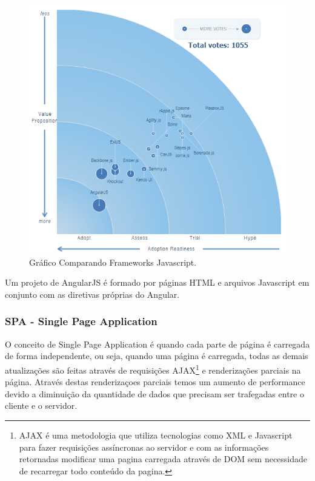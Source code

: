     \begin{figure}[hb]
    \centering
    \includegraphics[scale=0.6]{images/angularjs_framework_comparison.png}
    \caption{Gráfico Comparando Frameworks Javascript.}
    \label{fig:Gráfico Comparando Frameworks Javascript}
    \end{figure}
    
Um projeto de AngularJS é formado por páginas HTML e arquivos Javascript em conjunto com as diretivas próprias do Angular. 

\subsubsection{SPA - Single Page Application}

O conceito de Single Page Application é  quando cada parte de página é carregada de forma independente, ou seja, quando uma página é carregada, todas as demais atualizações são feitas através de requisições AJAX\footnote{AJAX é uma metodologia que utiliza tecnologias como XML e Javascript para fazer requisições assíncronas ao servidor e com as informações retornadas modificar uma pagina carregada através de DOM sem necessidade de recarregar todo conteúdo da pagina.} e renderizações parciais na página.
    Através destas renderizaçoes parciais temos um aumento de performance devido a diminuição da quantidade de dados que precisam ser trafegadas entre o cliente e o servidor.

